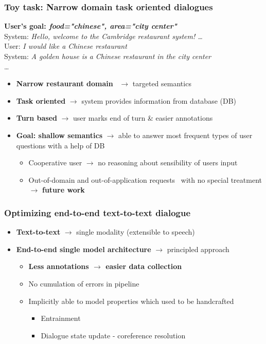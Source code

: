 \documentclass[10pt, compress,british,xcolor={svgnames,dvipsnames,x11names},trans]{beamer}
\def\sys#1{{\color{purple}System: \it #1}}
\def\usr#1{{\color{brown}User: \it #1}}
\begin{document}
\begin{frame}\frametitle{Toy task: Narrow domain task oriented dialogues}
    {\bf User's goal: {\it food="chinese", area="city center"}} \\
    \vfill
    \sys{Hello, welcome to the Cambridge restaurant system! \dots } \\
    \usr{I would like a Chinese restaurant} \\
    \sys{A golden house is a Chinese restaurant in the city center} \\
    \dots

    \begin{itemize}
        \item {\bf Narrow restaurant domain}~\cite{henderson2014second} $\longrightarrow$ targeted semantics
        \item {\bf Task oriented} $\longrightarrow$ system provides information from database (DB)
        \item {\bf Turn based} $\longrightarrow$ user marks end of turn \& easier annotations
        \item {\bf Goal: shallow semantics} $\longrightarrow$ able to answer most frequent types of user questions with a help of DB
            \begin{itemize}
                \item Cooperative user $\longrightarrow$ no reasoning about sensibility of users input   
                \item {\color{darkgreen} Out-of-domain and out-of-application requests~\cite{bohus2007error} with no special treatment} $\longrightarrow$ {\color{red} {\bf future work}}
            \end{itemize}
    \end{itemize}
\end{frame}

\begin{frame}\frametitle{Optimizing end-to-end text-to-text dialogue}
    \begin{itemize}
        \item {\bf Text-to-text} $\longrightarrow$ single modality (extensible to speech)
        \item {\bf End-to-end single model architecture} $\longrightarrow$ principled approach
            \begin{itemize}
                \item {\bf Less annotations $\longrightarrow$ easier data collection}
                \item No cumulation of errors in pipeline
                \item Implicitly able to model properties which used to be handcrafted 
                \begin{itemize}
                    \item Entrainment
                    \item Dialogue state update - coreference resolution
                \end{itemize}
            \end{itemize}
    \end{itemize}
\end{frame}
\end{document}
